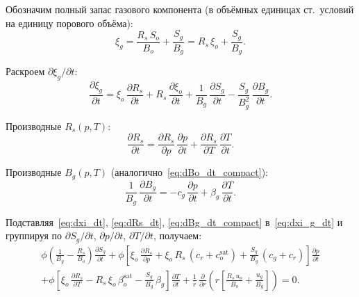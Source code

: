 \documentclass[12pt,a4paper]{article}
\begin{document}
Обозначим полный запас газового компонента (в объёмных единицах
ст.~условий на единицу порового объёма):
\begin{equation}\label{eq:xi_g}
  \xi_g = \frac{R_s\,S_o}{B_o} + \frac{S_g}{B_g}
         = R_s\,\xi_o + \frac{S_g}{B_g}.
\end{equation}

Раскроем $\partial\xi_g/\partial t$:
\begin{equation}\label{eq:dxi_g_dt}
  \frac{\partial\xi_g}{\partial t}
  = \xi_o\,\frac{\partial R_s}{\partial t}
    + R_s\,\frac{\partial\xi_o}{\partial t}
    + \frac{1}{B_g}\,\frac{\partial S_g}{\partial t}
    - \frac{S_g}{B_g^2}\,\frac{\partial B_g}{\partial t}.
\end{equation}

Производные $R_s(p,T)$:
\begin{equation}\label{eq:dRs_dt}
  \frac{\partial R_s}{\partial t}
  = \frac{\partial R_s}{\partial p}\,\frac{\partial p}{\partial t}
    + \frac{\partial R_s}{\partial T}\,\frac{\partial T}{\partial t}.
\end{equation}

Производные $B_g(p,T)$ (аналогично~\eqref{eq:dBo_dt_compact}):
\begin{equation}\label{eq:dBg_dt_compact}
  \frac{1}{B_g}\,\frac{\partial B_g}{\partial t}
  = -c_g\,\frac{\partial p}{\partial t}
    + \beta_g\,\frac{\partial T}{\partial t}.
\end{equation}

Подставляя~\eqref{eq:dxi_dt}, \eqref{eq:dRs_dt},
\eqref{eq:dBg_dt_compact} в~\eqref{eq:dxi_g_dt} и группируя
по $\partial S_g/\partial t$, $\partial p/\partial t$,
$\partial T/\partial t$, получаем:
\begin{multline}\label{eq:mass_gas_expanded}
  \boxed{
    \phi\!\left(\frac{1}{B_g} - \frac{R_s}{B_o}\right)
      \frac{\partial S_g}{\partial t}
    + \phi\!\left[\xi_o\,\frac{\partial R_s}{\partial p}
      + \xi_o\,R_s\,(c_r + c_o^{\mathrm{sat}})
      + \frac{S_g}{B_g}\,(c_g + c_r)\right]
      \frac{\partial p}{\partial t}
  } \\
  \boxed{
    + \phi\!\left[\xi_o\,\frac{\partial R_s}{\partial T}
      - R_s\,\xi_o\,\beta_o^{\mathrm{sat}}
      - \frac{S_g}{B_g}\,\beta_g\right]
      \frac{\partial T}{\partial t}
    + \frac{1}{r}\,\frac{\partial}{\partial r}\!\left(r\!\left[
      \frac{R_s\,u_o}{B_o} + \frac{u_g}{B_g}
    \right]\right) = 0.
  }
\end{multline}
\end{document}

